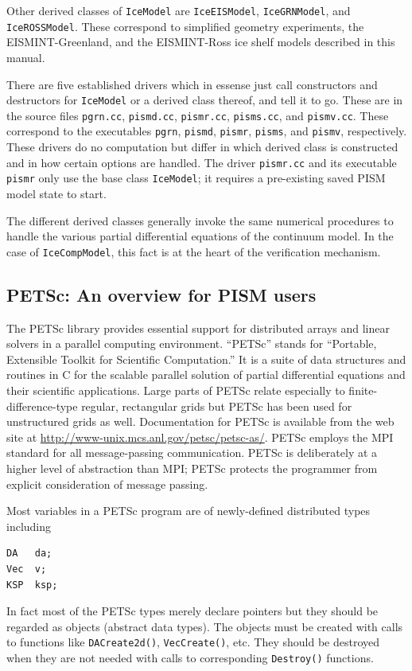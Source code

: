 \documentclass[11pt,final]{amsart}
\renewcommand{\t}[1]{\texttt{#1}}
\begin{document}
Other derived classes of \t{IceModel} are \t{IceEISModel}, \t{IceGRNModel}, and \t{IceROSSModel}.  These correspond to simplified geometry experiments, the EISMINT-Greenland, and the EISMINT-Ross ice shelf models described in this manual.

There are five established drivers which in essense just call constructors and destructors for \t{IceModel} or a derived class thereof, and tell it to go.  These are in the source files \verb|pgrn.cc|, \verb|pismd.cc|, \verb|pismr.cc|, \verb|pisms.cc|, and \verb|pismv.cc|.  These correspond to the executables \verb|pgrn|, \verb|pismd|, \verb|pismr|, \verb|pisms|, and \verb|pismv|, respectively.  These drivers do no computation but differ in which derived class is constructed and in how certain options are handled.  The driver \verb|pismr.cc| and its executable \verb|pismr| only use the base class \verb|IceModel|; it requires a pre-existing saved PISM model state to start.

The different derived classes generally invoke the same numerical procedures to handle the various partial differential equations of the continuum model.  In the case of \t{IceCompModel}, this fact is at the heart of the verification mechanism.

\subsection{PETSc: An overview for PISM users}  The PETSc library \cite{petsc-user-ref,petsc-efficient} provides essential support for distributed arrays and linear solvers in a parallel computing environment.  ``PETSc'' stands for ``Portable, Extensible Toolkit for Scientific Computation.''  It is a suite of data structures and routines in C for the scalable parallel solution of partial differential equations and their scientific applications.  Large parts of PETSc relate especially to finite-difference-type regular, rectangular grids but PETSc has been used for unstructured grids as well.  Documentation for PETSc is available from the web site at \url{http://www-unix.mcs.anl.gov/petsc/petsc-as/}.  PETSc employs the MPI standard for all message-passing communication.  PETSc is deliberately at a higher level of abstraction than MPI; PETSc protects the programmer from explicit consideration of message passing.

Most variables in a PETSc program are of newly-defined distributed types including
\begin{verbatim}
DA   da;
Vec  v;
KSP  ksp;
\end{verbatim}
In fact most of the PETSc types merely declare pointers but they should be regarded as objects (abstract data types).  The objects must be created with calls to functions like \t{DACreate2d()}, \t{VecCreate()}, etc.  They should be destroyed when they are not needed with calls to corresponding \t{Destroy()} functions.
\end{document}
